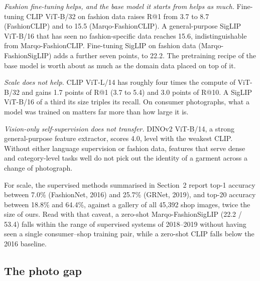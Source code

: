 \documentclass[10pt,twocolumn,letterpaper]{article}
\makeatletter
\newcommand{\recall}[1]{R@#1}
\makeatother
\begin{document}
\emph{Fashion fine-tuning helps, and the base model it starts from helps as much.} Fine-tuning CLIP ViT-B/32 on fashion data raises \recall{1} from 3.7 to 8.7 (FashionCLIP) and to 15.5 (Marqo-FashionCLIP). A general-purpose SigLIP ViT-B/16 that has seen no fashion-specific data reaches 15.6, indistinguishable from Marqo-FashionCLIP. Fine-tuning SigLIP on fashion data (Marqo-FashionSigLIP) adds a further seven points, to 22.2. The pretraining recipe of the base model is worth about as much as the domain data placed on top of it.

\emph{Scale does not help.} CLIP ViT-L/14 has roughly four times the compute of ViT-B/32 and gains 1.7 points of \recall{1} (3.7 to 5.4) and 3.0 points of \recall{10}. A SigLIP ViT-B/16 of a third its size triples its recall. On consumer photographs, what a model was trained on matters far more than how large it is.

\emph{Vision-only self-supervision does not transfer.} DINOv2 ViT-B/14, a strong general-purpose feature extractor, scores 4.0, level with the weakest CLIP. Without either language supervision or fashion data, features that serve dense and category-level tasks well do not pick out the identity of a garment across a change of photograph.

For scale, the supervised methods summarised in Section~2 report top-1 accuracy between 7.0\% (FashionNet, 2016) and 25.7\% (GRNet, 2019), and top-20 accuracy between 18.8\% and 64.4\%, against a gallery of all 45,392 shop images, twice the size of ours. Read with that caveat, a zero-shot Marqo-FashionSigLIP (22.2 / 53.4) falls within the range of supervised systems of 2018--2019 without having seen a single consumer--shop training pair, while a zero-shot CLIP falls below the 2016 baseline.

\subsection{The photo gap}
\end{document}
